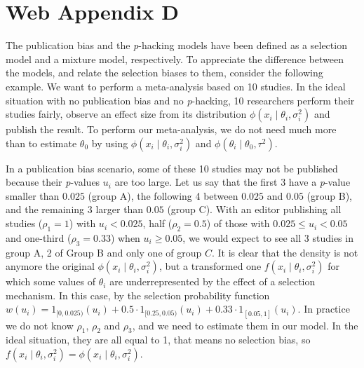 \section*{Web Appendix D}

The publication bias and the \textit{p}-hacking models have been defined as a selection model and a mixture model, respectively. To appreciate the difference between the models, and relate the selection biases to them, consider the following example. We want to perform a meta-analysis based on 10 studies. In the ideal situation with no publication bias and no \textit{p}-hacking, 10 researchers perform their studies fairly, observe an effect size from its distribution $\phi(x_{i}\mid\theta_i,\sigma^2_{i})$ and publish the result. To perform our meta-analysis, we do not need much more than to estimate $\theta_0$ by using $\phi(x_{i}\mid\theta_i,\sigma^2_{i})$ and $\phi(\theta_{i}\mid\theta_0,\tau^2)$.

In a publication bias scenario, some of these 10 studies may not be published because their \textit{p}-values $u_i$ are too large. Let us say that the first 3 have a \textit{p}-value smaller than $0.025$ (group A), the following 4 between $0.025$ and $0.05$ (group B), and the remaining 3 larger than $0.05$ (group C). With an editor publishing all studies ($\rho_{1} = 1$) with $u_i < 0.025$, half ($\rho_{2} = 0.5$) of those with $0.025 \leq u_i < 0.05$ and one-third ($\rho_{3} = 0.33$) when $u_i \geq 0.05$, we would expect to see all 3 studies in group A, 2 of Group B and only one of group $C$. It is clear that the density is not anymore the original $\phi(x_{i}\mid\theta_i,\sigma^2_{i})$, but a transformed one $f(x_{i}\mid\theta_i,\sigma^2_{i})$ for which some values of $\theta_i$ are underrepresented by the effect of a selection mechanism. In this case, by the selection probability function $w(u_i) = 1_{[0,0.025)}(u_i) + 0.5 \cdot 1_{[0.25,0.05)}(u_i) + 0.33 \cdot 1_{[0.05, 1]}(u_i)$. In practice we do not know $\rho_{1}$, $\rho_{2}$ and $\rho_{3}$, and we need to estimate them in our model. In the ideal situation, they are all equal to 1, that means no selection bias, so $f(x_{i}\mid\theta_{i},\sigma^2_{i}) = \phi(x_{i}\mid\theta_i,\sigma^2_{i})$.

